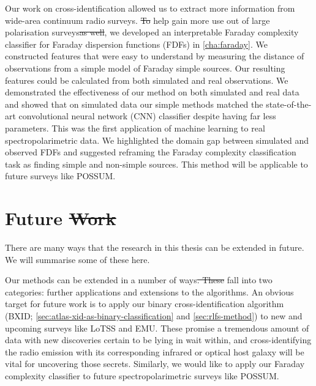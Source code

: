 \documentclass[11pt, a4paper]{book}
\providecommand{\DIFaddtex}[1]{{\protect\color{blue}\uwave{#1}}} %
\providecommand{\DIFdeltex}[1]{{\protect\color{red}\sout{#1}}}                      %
\providecommand{\DIFaddbegin}{} %
\providecommand{\DIFaddend}{} %
\providecommand{\DIFdelbegin}{} %
\providecommand{\DIFdelend}{} %
\providecommand{\DIFadd}[1]{\texorpdfstring{\DIFaddtex{#1}}{#1}} %
\providecommand{\DIFdel}[1]{\texorpdfstring{\DIFdeltex{#1}}{}} %
\newcommand{\DIFscaledelfig}{0.5}
\newlength{\DIFdelgraphicswidth} %
\newlength{\DIFdelgraphicsheight} %
\newcommand{\DIFaddincludegraphics}[2][]{{\color{blue}\fbox{\DIFOincludegraphics[#1]{#2}}}} %
\newcommand{\DIFdelincludegraphics}[2][]{%
\sbox{\DIFdelgraphicsbox}{\DIFOincludegraphics[#1]{#2}}%
\settoboxwidth{\DIFdelgraphicswidth}{\DIFdelgraphicsbox} %
\settoboxtotalheight{\DIFdelgraphicsheight}{\DIFdelgraphicsbox} %
\scalebox{\DIFscaledelfig}{%
\parbox[b]{\DIFdelgraphicswidth}{\usebox{\DIFdelgraphicsbox}\\[-\baselineskip] \rule{\DIFdelgraphicswidth}{0em}}\llap{\resizebox{\DIFdelgraphicswidth}{\DIFdelgraphicsheight}{%
\setlength{\unitlength}{\DIFdelgraphicswidth}%
\begin{picture}(1,1)%
\thicklines\linethickness{2pt} %
{\color[rgb]{1,0,0}\put(0,0){\framebox(1,1){}}}%
{\color[rgb]{1,0,0}\put(0,0){\line( 1,1){1}}}%
{\color[rgb]{1,0,0}\put(0,1){\line(1,-1){1}}}%
\end{picture}%
}\hspace*{3pt}}} %
} %
\DeclareRobustCommand{\DIFaddbegin}{\DIFOaddbegin \let\includegraphics\DIFaddincludegraphics} %
\DeclareRobustCommand{\DIFaddend}{\DIFOaddend \let\includegraphics\DIFOincludegraphics} %
\DeclareRobustCommand{\DIFdelbegin}{\DIFOdelbegin \let\includegraphics\DIFdelincludegraphics} %
\DeclareRobustCommand{\DIFdelend}{\DIFOaddend \let\includegraphics\DIFOincludegraphics} %
\begin{document}
Our work on cross-identification allowed us to extract more information from wide-area continuum radio surveys. \DIFdelbegin \DIFdel{To }\DIFdelend \DIFaddbegin \DIFadd{Additionally, to }\DIFaddend help gain more use out of large polarisation surveys\DIFdelbegin \DIFdel{as well}\DIFdelend , we developed an interpretable Faraday complexity classifier for Faraday dispersion functions (FDFs) in \autoref{cha:faraday}. We constructed features that were easy to understand by measuring the distance of observations from a simple model of Faraday simple sources. Our resulting features could be calculated from both simulated and real observations. We demonstrated the effectiveness of our method on both simulated and real data and showed that on simulated data our simple methods matched the state-of-the-art convolutional neural network (CNN) classifier despite having far less parameters. This was the first application of machine learning to real spectropolarimetric data. We highlighted the domain gap between simulated and observed FDFs and suggested reframing the Faraday complexity classification task as finding simple and non-simple sources. This method will be applicable to future surveys like POSSUM.





\section{Future \DIFdelbegin \DIFdel{Work}\DIFdelend \DIFaddbegin \DIFadd{work}\DIFaddend }
\label{sec:future}

    There are many ways that the research in this thesis can be extended in future. We will summarise some of these here.

    Our methods can be extended in a number of ways\DIFdelbegin \DIFdel{. These }\DIFdelend \DIFaddbegin \DIFadd{, which }\DIFaddend fall into two categories: further applications and extensions to the algorithms. An obvious target for future work is to apply our binary cross-identification algorithm (BXID; \autoref{sec:atlas-xid-as-binary-classification} and \autoref{sec:rlfs-method}) to new and upcoming surveys like LoTSS and EMU. These promise a tremendous amount of data with new discoveries certain to be lying in wait within, and cross-identifying the radio emission with its corresponding infrared or optical host galaxy will be vital for uncovering those secrets. Similarly, we would like to apply our Faraday complexity classifier to future spectropolarimetric surveys like POSSUM.
\DIFaddbegin 
\end{document}
